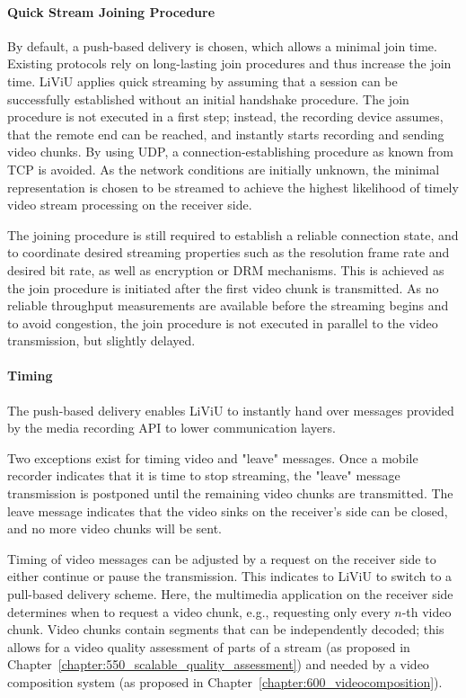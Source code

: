 \paragraph{Quick Stream Joining Procedure}
By default, a push-based delivery is chosen, which allows a minimal join time.
Existing protocols rely on long-lasting join procedures and thus increase the join time.
\ac{LiViU} applies quick streaming by assuming that a session can be successfully established without an initial handshake procedure.
The join procedure is not executed in a first step; instead, the recording device assumes, that the remote end can be reached, and instantly starts recording and sending video chunks.
By using \ac{UDP}, a connection-establishing procedure as known from \ac{TCP} is avoided.
As the network conditions are initially unknown, the minimal representation is chosen to be streamed to achieve the highest likelihood of timely video stream processing on the receiver side.

The joining procedure is still required to establish a reliable connection state, and to coordinate desired streaming properties such as the resolution frame rate and desired bit rate, as well as encryption or \ac{DRM} mechanisms.
This is achieved as the join procedure is initiated after the first video chunk is transmitted.
As no reliable throughput measurements are available before the streaming begins and to avoid congestion, the join procedure is not executed in parallel to the video transmission, but slightly delayed.
\paragraph{Timing}
The push-based delivery enables \ac{LiViU} to instantly hand over messages provided by the media recording \ac{API} to lower communication layers.

Two exceptions exist for timing video and "leave" messages. 
Once a mobile recorder indicates that it is time to stop streaming, the "leave" message transmission is postponed until the remaining video chunks are transmitted. 
The leave message indicates that the video sinks on the receiver's side can be closed, and no more video chunks will be sent.

Timing of video messages can be adjusted by a request on the receiver side to either continue or pause the transmission.
This indicates to \ac{LiViU} to switch to a pull-based delivery scheme.
Here, the multimedia application on the receiver side determines when to request a video chunk, e.g., requesting only every $n$-th video chunk.
Video chunks contain segments that can be independently decoded; this allows for a video quality assessment of parts of a stream (as proposed in Chapter~\ref{chapter:550_scalable_quality_assessment}) and needed by a video composition system (as proposed in Chapter~\ref{chapter:600_videocomposition}).
